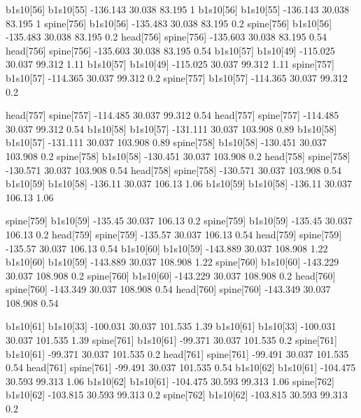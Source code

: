 b1s10[56]    b1s10[55]    -136.143    30.038    83.195    1
b1s10[56]    b1s10[55]    -136.143    30.038    83.195    1
spine[756]    b1s10[56]    -135.483    30.038    83.195    0.2
spine[756]    b1s10[56]    -135.483    30.038    83.195    0.2
head[756]    spine[756]    -135.603    30.038    83.195    0.54
head[756]    spine[756]    -135.603    30.038    83.195    0.54
b1s10[57]    b1s10[49]    -115.025    30.037    99.312    1.11
b1s10[57]    b1s10[49]    -115.025    30.037    99.312    1.11
spine[757]    b1s10[57]    -114.365    30.037    99.312    0.2
spine[757]    b1s10[57]    -114.365    30.037    99.312    0.2


head[757]    spine[757]    -114.485    30.037    99.312    0.54
head[757]    spine[757]    -114.485    30.037    99.312    0.54
b1s10[58]    b1s10[57]    -131.111    30.037    103.908    0.89
b1s10[58]    b1s10[57]    -131.111    30.037    103.908    0.89
spine[758]    b1s10[58]    -130.451    30.037    103.908    0.2
spine[758]    b1s10[58]    -130.451    30.037    103.908    0.2
head[758]    spine[758]    -130.571    30.037    103.908    0.54
head[758]    spine[758]    -130.571    30.037    103.908    0.54
b1s10[59]    b1s10[58]    -136.11    30.037    106.13    1.06
b1s10[59]    b1s10[58]    -136.11    30.037    106.13    1.06


spine[759]    b1s10[59]    -135.45    30.037    106.13    0.2
spine[759]    b1s10[59]    -135.45    30.037    106.13    0.2
head[759]    spine[759]    -135.57    30.037    106.13    0.54
head[759]    spine[759]    -135.57    30.037    106.13    0.54
b1s10[60]    b1s10[59]    -143.889    30.037    108.908    1.22
b1s10[60]    b1s10[59]    -143.889    30.037    108.908    1.22
spine[760]    b1s10[60]    -143.229    30.037    108.908    0.2
spine[760]    b1s10[60]    -143.229    30.037    108.908    0.2
head[760]    spine[760]    -143.349    30.037    108.908    0.54
head[760]    spine[760]    -143.349    30.037    108.908    0.54


b1s10[61]    b1s10[33]    -100.031    30.037    101.535    1.39
b1s10[61]    b1s10[33]    -100.031    30.037    101.535    1.39
spine[761]    b1s10[61]    -99.371    30.037    101.535    0.2
spine[761]    b1s10[61]    -99.371    30.037    101.535    0.2
head[761]    spine[761]    -99.491    30.037    101.535    0.54
head[761]    spine[761]    -99.491    30.037    101.535    0.54
b1s10[62]    b1s10[61]    -104.475    30.593    99.313    1.06
b1s10[62]    b1s10[61]    -104.475    30.593    99.313    1.06
spine[762]    b1s10[62]    -103.815    30.593    99.313    0.2
spine[762]    b1s10[62]    -103.815    30.593    99.313    0.2


